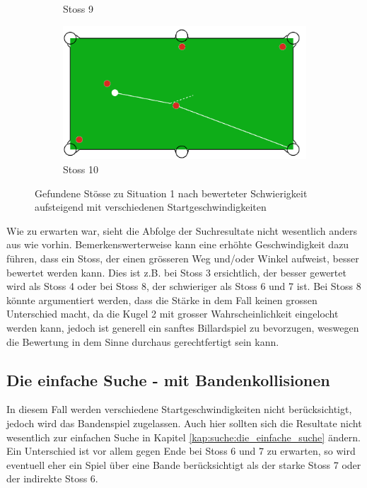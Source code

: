\begin{figure}[h!]
\begin{subfigure}[b]{0.3\textwidth}
        \caption{Stoss 9}
        \label{fig:situation_velocity_1_solution_9}
    \end{subfigure}
    \hfill
    \begin{subfigure}[b]{0.3\textwidth}
        \centering
        \includegraphics[width=1.0\linewidth]{../common/04_results/resources/simple_search/situation_diverse_solution_velocity_10.PNG}
        \caption{Stoss 10}
        \label{fig:situation_velocity_1_solution_10}
    \end{subfigure}
    \caption{Gefundene Stösse zu Situation 1 nach bewerteter Schwierigkeit aufsteigend mit verschiedenen Startgeschwindigkeiten}
    \label{fig:situation_1_solutions_startgeschwindigkeit}
\end{figure}

Wie zu erwarten war, sieht die Abfolge der Suchresultate nicht wesentlich anders aus wie vorhin.
Bemerkenswerterweise kann eine erhöhte Geschwindigkeit dazu führen, dass ein Stoss,
der einen grösseren Weg und/oder Winkel aufweist, besser bewertet werden kann.
Dies ist z.B. bei Stoss 3 ersichtlich, der besser gewertet wird als Stoss 4 oder bei
Stoss 8, der schwieriger als Stoss 6 und 7 ist. Bei Stoss 8 könnte argumentiert werden, dass die Stärke
in dem Fall keinen grossen Unterschied macht, da die Kugel 2 mit grosser Wahrscheinlichkeit eingelocht werden kann,
jedoch ist generell ein sanftes Billardspiel zu bevorzugen, weswegen die Bewertung in dem Sinne durchaus gerechtfertigt
sein kann.

\newpage

\subsection{Die einfache Suche - mit Bandenkollisionen}
In diesem Fall werden verschiedene Startgeschwindigkeiten nicht berücksichtigt, jedoch wird das Bandenspiel zugelassen.
Auch hier sollten sich die Resultate nicht wesentlich zur einfachen Suche in Kapitel \ref{kap:suche:die_einfache_suche} ändern.
Ein Unterschied ist vor allem gegen Ende bei Stoss 6 und 7 zu erwarten, so wird eventuell eher ein Spiel über eine Bande berücksichtigt
als der starke Stoss 7 oder der indirekte Stoss 6.

